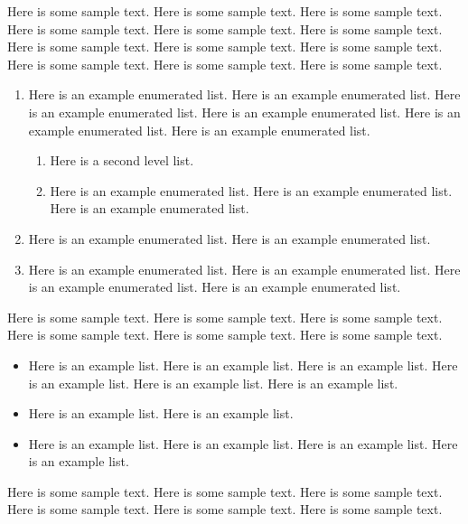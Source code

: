 Here is some sample text. Here is some sample text. Here is some sample
text. Here is some sample text. Here is some sample text. Here is some
sample text. Here is some sample text. Here is some sample text. Here is
some sample text. Here is some sample text. Here is some sample text.
Here is some sample text.
%
\begin{enumerate}
%
\item Here is an example enumerated list. Here is an example enumerated
list. Here is an example enumerated list. Here is an example enumerated
list. Here is an example enumerated list. Here is an example enumerated
list.
%
\begin{enumerate}
%
\item Here is a second level list.
%
\item Here is an example enumerated list. Here is an example enumerated
list. Here is an example enumerated list.
%
\end{enumerate}
%
\item Here is an example enumerated list. Here is an example enumerated
list.
%
\item Here is an example enumerated list. Here is an example enumerated
list. Here is an example enumerated list. Here is an example enumerated
list.
%
\end{enumerate}
%
Here is some sample text. Here is some sample text. Here is some sample
text. Here is some sample text. Here is some sample text. Here is some
sample text.
%
\begin{itemize}
%
\item Here is an example  list. Here is an example list. Here is an
example  list. Here is an example list. Here is an example  list. Here
is an example list.
%
\item Here is an example  list. Here is an example list.
%
\item Here is an example  list. Here is an example list. Here is an
example  list. Here is an example list.
%
\end{itemize}
%
Here is some sample text. Here is some sample text. Here is some sample
text. Here is some sample text. Here is some sample text. Here is some
sample text.

\endinput
